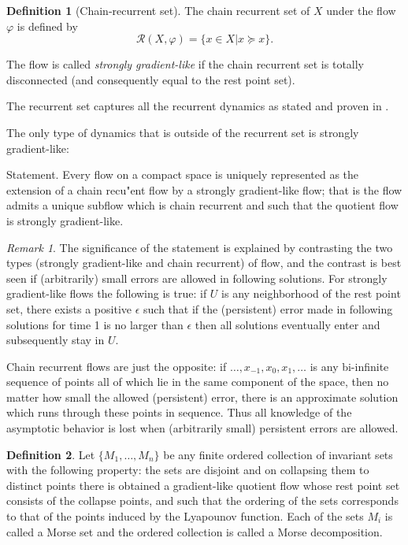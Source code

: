 \documentclass{scrartcl}
\theoremstyle{definition}
\newtheorem{definition}{Definition}
\theoremstyle{remark}
\newtheorem{remark}{Remark}
\begin{document}
\begin{definition}[Chain-recurrent set]
The chain recurrent set of $X$ under the flow $\varphi$ is defined by 
\[\mathcal{R}(X,\varphi) = \{x\in X|x\succeq x\}.\]
\end{definition}

The flow is called \emph{strongly gradient-like} if the chain recurrent set is totally disconnected (and consequently equal to the rest point set). 

The recurrent set captures all the recurrent dynamics as stated and proven in \citep[Chapter I.8.2]{conley1978}.

The only type of dynamics that is outside of the recurrent set is strongly gradient-like:

Statement. Every flow on a compact space is uniquely represented as the extension of a chain recu"ent flow by a strongly gradient-like flow; that is the flow admits a unique subflow which is chain recurrent and such that the quotient flow is strongly gradient-like.

\begin{remark}\label{rem:error_noise}
The significance of the statement is explained by contrasting the two types (strongly gradient-like and chain recurrent) of flow, and the contrast is best seen if (arbitrarily) small errors are allowed in following solutions. For strongly gradient-like flows the following is true: if $U$ is any neighborhood of the rest point set, there exists a positive $\epsilon$ such that if the (persistent) error made in following solutions for time 1 is no larger than $\epsilon$ then all solutions eventually enter and subsequently stay in $U$.

Chain recurrent flows are just the opposite: if $\dots,x_{-1},x_0, x_{1},\dots$ is any bi-infinite sequence of points all of which lie in the same component of the space, then no matter how small the allowed (persistent) error, there is an approximate solution which runs through these points in sequence. Thus all knowledge of the asymptotic behavior is lost when (arbitrarily small) persistent errors are allowed.
\end{remark}

\begin{definition}
Let $\{M_1, \dots, M_n\}$ be any finite ordered collection of invariant sets with the following property: the sets are disjoint and on collapsing them to distinct points there is obtained a gradient-like quotient flow whose rest point set consists of the collapse points, and such that the ordering of the sets corresponds to that of the points induced by the Lyapounov function.
 Each of the sets $M_i$ is called a Morse set and the ordered collection is called a Morse decomposition.
\end{definition}
\end{document}
